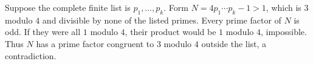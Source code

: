 Suppose the complete finite list is $p_1,\ldots,p_k$. Form $N=4p_1\cdots p_k-1>1$, which is $3$ modulo $4$ and divisible by none of the listed primes. Every prime factor of $N$ is odd. If they were all $1$ modulo $4$, their product would be $1$ modulo $4$, impossible. Thus $N$ has a prime factor congruent to $3$ modulo $4$ outside the list, a contradiction.
